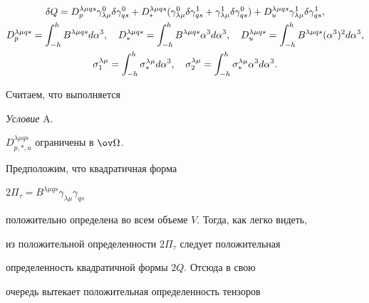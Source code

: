 \begin{gather} 


\delta Q=D^{\lambda\mu qs}_p\gamma^0_{\lambda\mu} 


\delta\gamma^0_{qs}+D^{\lambda\mu qs}_* 


(\gamma^0_{\lambda\mu}\delta\gamma^1_{qs}+ 


\gamma^1_{\lambda\mu}\delta\gamma^0_{qs})+ 


D^{\lambda\mu qs}_u\gamma^1_{\lambda\mu} 


\delta\gamma^1_{qs}, \\ 


%


D^{\lambda\mu qs}_p=\int^h_{-h} B^{\lambda\mu qs}d\alpha^3,\quad 


D^{\lambda\mu qs}_*=\int^h_{-h}B^{\lambda\mu qs} 


\alpha^3d\alpha^3,\quad 


D^{\lambda\mu qs}_u=\int^h_{-h}B^{\lambda\mu qs} 


(\alpha^3)^2d\alpha^3,\notag \\ 


%


\sigma^{\lambda\mu}_1=\int^h_{-h}\sigma^{\lambda\mu}_*d\alpha^3, 


\quad \sigma^{\lambda\mu}_2=\int^h_{-h}\sigma^{\lambda\mu}_* 


\alpha^3d\alpha^3.\notag 


\end{gather} 


Считаем, что выполняется 


\medskip 


 


{\it Условие} A. 


$D^{\lambda\mu{}qs}_{p,*,u}$ ограничены в $\ov\Omega$. 


\medskip 


 


Предположим, что квадратичная форма 


$2\Pi_\tau=B^{\lambda\mu{}qs}\gamma_{\lambda\mu}\gamma_{qs}$ 


положительно определена во всем объеме $V$. Тогда, как легко видеть, 


из положительной определенности $2\Pi_\tau$ следует положительная  


определенность квадратичной формы $2Q$. Отсюда в свою 


очередь вытекает положительная определенность тензоров 


